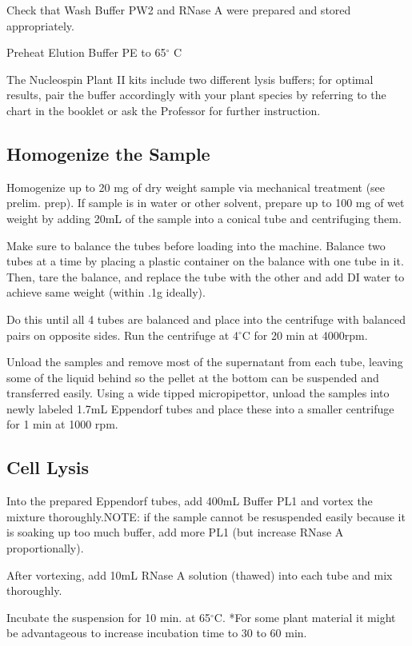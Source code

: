 \documentclass[12pt]{../SOP3_alpha}\usepackage[]{graphicx}\usepackage[]{color}
\begin{document}
\NP	Check that Wash Buffer PW2 and RNase A were prepared and stored appropriately.

\NP Preheat Elution Buffer PE to 65$^\circ$ C

\NP The Nucleospin Plant II kits include two different lysis buffers; for optimal results, pair the buffer accordingly with your plant species by referring to the chart in the booklet or ask the Professor for further instruction. 


\subsection*{Homogenize the Sample}

\NP Homogenize up to 20 mg of dry weight sample via mechanical treatment (see prelim. prep). If sample is in water or other solvent, prepare up to 100 mg of wet weight by adding 20mL of the sample into a conical tube and centrifuging them. 

\NP Make sure to balance the tubes before loading into the machine. Balance two tubes at a time by placing a plastic container on the balance with one tube in it. Then, tare the balance, and replace the tube with the other and add DI water to achieve same weight (within .1g ideally).

\NP Do this until all 4 tubes are balanced and place into the centrifuge with balanced pairs on opposite sides. Run the centrifuge at 4$^\circ$C for 20 min at 4000rpm.

\NP Unload the samples and remove most of the supernatant from each tube, leaving some of the liquid behind so the pellet at the bottom can be suspended and transferred easily. Using a wide tipped micropipettor, unload the samples into newly labeled 1.7mL Eppendorf tubes and place these into a smaller centrifuge for 1 min at 1000 rpm.


\subsection*{Cell Lysis}

\NP Into the prepared Eppendorf tubes, add 400mL Buffer PL1 and vortex the mixture thoroughly.NOTE: if the sample cannot be resuspended easily because it is soaking up too much buffer, add more PL1 (but increase RNase A proportionally).

\NP After vortexing, add 10mL RNase A solution (thawed) into each tube and mix thoroughly.

\NP Incubate the suspension for 10 min. at 65$^\circ$C. *For some plant material it might be advantageous to increase incubation time to 30 to 60 min. 
\end{document}
